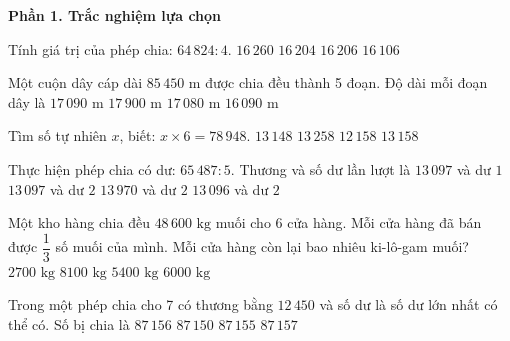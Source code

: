 \textbf{Phần 1. Trắc nghiệm lựa chọn}

\begin{ex} %
Tính giá trị của phép chia: $64\,824 : 4$.
\choice
{$16\,260$}
{$16\,204$}
{\True $16\,206$}
{$16\,106$}
\end{ex}

\begin{ex} %
Một cuộn dây cáp dài $85\,450\text{ m}$ được chia đều thành 5 đoạn. Độ dài mỗi đoạn dây là
\choice
{\True $17\,090\text{ m}$}
{$17\,900\text{ m}$}
{$17\,080\text{ m}$}
{$16\,090\text{ m}$}
\end{ex}

\begin{ex} %
Tìm số tự nhiên $x$, biết: $x \times 6 = 78\,948$.
\choice
{$13\,148$}
{$13\,258$}
{$12\,158$}
{\True $13\,158$}
\end{ex}

\begin{ex} %
Thực hiện phép chia có dư: $65\,487 : 5$. Thương và số dư lần lượt là
\choice
{$13\,097$ và dư $1$}
{\True $13\,097$ và dư $2$}
{$13\,970$ và dư $2$}
{$13\,096$ và dư $2$}
\end{ex}

\begin{ex} %
Một kho hàng chia đều $48\,600\text{ kg}$ muối cho 6 cửa hàng. Mỗi cửa hàng đã bán được $\dfrac{1}{3}$ số muối của mình. Mỗi cửa hàng còn lại bao nhiêu ki-lô-gam muối?
\choice
{$2700\text{ kg}$}
{$8100\text{ kg}$}
{\True $5400\text{ kg}$}
{$6000\text{ kg}$}
\end{ex}

\begin{ex} %
Trong một phép chia cho 7 có thương bằng $12\,450$ và số dư là số dư lớn nhất có thể có. Số bị chia là
\choice
{\True $87\,156$}
{$87\,150$}
{$87\,155$}
{$87\,157$}
\end{ex}

